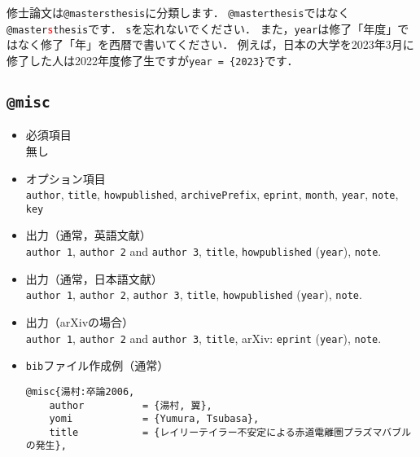 \documentclass[a4paper,fleqn,uplatex,dvipdfmx]{jsarticle}
\makeatletter
\newcommand{\ttmastersthesis}{\texttt{@mastersthesis}}
\newcommand{\ttmisc}{\texttt{@misc}}
\makeatother
\begin{document}
修士論文は\ttmastersthesis に分類します．
\verb|@masterthesis|ではなく\texttt{@master\textcolor{red}{s}thesis}です．
\verb|s|を忘れないでください．
また，\verb|year|は修了「年度」ではなく修了「年」を西暦で書いてください．
例えば，日本の大学を2023年3月に修了した人は2022年度修了生ですが\verb|year = {2023}|です．

\subsection{\ttmisc}
\label{ssec:misc}
\begin{screen}
    \begin{itemize}
        \item 必須項目 \\
        無し
        \item オプション項目 \\
        \verb|author|, \verb|title|, \verb|howpublished|, \verb|archivePrefix|, \verb|eprint|, \verb|month|, \verb|year|, \verb|note|, \verb|key|
        \item 出力（通常，英語文献） \\
            \colorbox[gray]{0.8}{\texttt{author 1}}, \colorbox[gray]{0.8}{\texttt{author 2}} and \colorbox[gray]{0.8}{\texttt{author 3}}, \colorbox[gray]{0.8}{\texttt{title}}, \colorbox[gray]{0.8}{\texttt{howpublished}} (\colorbox[gray]{0.8}{\texttt{year}}), \colorbox[gray]{0.8}{\texttt{note}}.
        \item 出力（通常，日本語文献） \\
            \colorbox[gray]{0.8}{\texttt{author 1}}, \colorbox[gray]{0.8}{\texttt{author 2}}, \colorbox[gray]{0.8}{\texttt{author 3}}, \colorbox[gray]{0.8}{\texttt{title}}, \colorbox[gray]{0.8}{\texttt{howpublished}} (\colorbox[gray]{0.8}{\texttt{year}}), \colorbox[gray]{0.8}{\texttt{note}}.
        \item 出力（arXivの場合） \\
            \colorbox[gray]{0.8}{\texttt{author 1}}, \colorbox[gray]{0.8}{\texttt{author 2}} and \colorbox[gray]{0.8}{\texttt{author 3}}, \colorbox[gray]{0.8}{\texttt{title}}, arXiv: \colorbox[gray]{0.8}{\texttt{eprint}} (\colorbox[gray]{0.8}{\texttt{year}}), \colorbox[gray]{0.8}{\texttt{note}}.
        \item \verb|bib|ファイル作成例（通常） \vspace{-3mm}
\begin{verbatim}
@misc{湯村:卒論2006,
    author          = {湯村, 翼},
    yomi            = {Yumura, Tsubasa},
    title           = {レイリーテイラー不安定による赤道電離圏プラズマバブルの発生},

\end{verbatim}
\end{itemize}
\end{screen}
\end{document}
